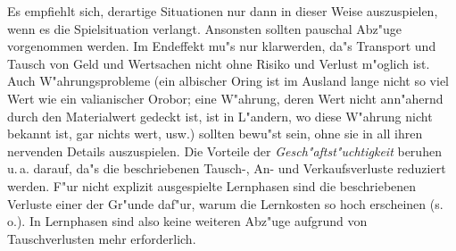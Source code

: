\documentclass[10pt,a4paper,germanpar]{article}
\begin{document}

Es empfiehlt sich, derartige Situationen nur dann in dieser Weise
auszuspielen, wenn es die Spielsituation verlangt. Ansonsten sollten
pauschal Abz"uge vorgenommen werden. Im Endeffekt mu"s nur klarwerden,
da"s Transport und Tausch von Geld und Wertsachen nicht ohne Risiko
und Verlust m"oglich ist. Auch W"ahrungsprobleme (ein albischer Oring
ist im Ausland lange nicht so viel Wert wie ein valianischer Orobor;
eine W"ahrung, deren Wert nicht ann"ahernd durch den Materialwert
gedeckt ist, ist in L"andern, wo diese W"ahrung nicht bekannt ist, gar
nichts wert, usw.) sollten bewu"st sein, ohne sie in all ihren
nervenden Details auszuspielen. Die Vorteile der
\emph{Gesch"aftst"uchtigkeit} beruhen u.\,a.  darauf, da"s die
beschriebenen Tausch-, An- und Verkaufsverluste reduziert werden. F"ur
nicht explizit ausgespielte Lernphasen sind die beschriebenen Verluste
einer der Gr"unde daf"ur, warum die Lernkosten so hoch erscheinen
(s.\,o.). In Lernphasen sind also keine weiteren Abz"uge aufgrund von
Tauschverlusten mehr erforderlich.
\end{document}
